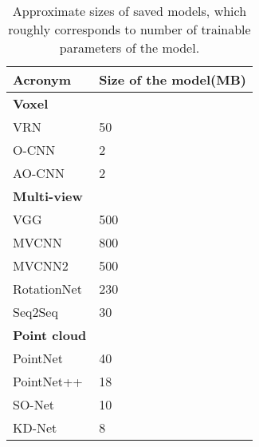 \begin{table}[]
	\begin{tabular}{ll}
		\hline
		\textbf{Acronym}       & Size of the model(MB) \\ \hline
		\textbf{Voxel }        &                       \\
		VRN                    & 50                    \\
		O-CNN                  & 2                     \\
		AO-CNN                 & 2                     \\
		\textbf{Multi-view }   &                       \\
		VGG                    & 500                   \\
		MVCNN                  & 800                   \\
		MVCNN2                 & 500                   \\
		RotationNet            & 230                   \\
		Seq2Seq                & 30                    \\
		\textbf{Point cloud  } &                       \\
		PointNet               & 40                    \\
		PointNet++             & 18                    \\
		SO-Net                 & 10                    \\
		KD-Net                 & 8
	\end{tabular}
\caption{Approximate sizes of saved models, which roughly corresponds to number of trainable parameters of the model.}
\label{Table:accs}
\end{table}